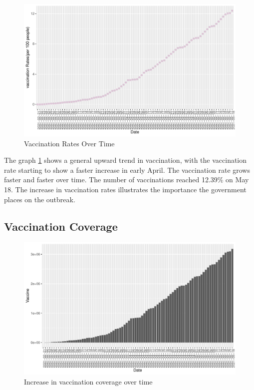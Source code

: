 \documentclass[11pt,a4paper,]{article}
\begin{document}
\begin{figure}
\centering
\includegraphics{report_files/figure-latex/FigRefplot-1.pdf}
\caption{\label{fig:FigRefplot}Vaccination Rates Over Time}
\end{figure}

The graph \ref{fig:FigRefplot} shows a general upward trend in vaccination, with the vaccination rate starting to show a faster increase in early April. The vaccination rate grows faster and faster over time. The number of vaccinations reached 12.39\% on May 18. The increase in vaccination rates illustrates the importance the government places on the outbreak.

\hypertarget{vaccination-coverage}{%
\subsection{Vaccination Coverage}\label{vaccination-coverage}}

\begin{figure}

{\centering \includegraphics{report_files/figure-latex/FigRefz-1} 

}

\caption{Increase in vaccination coverage over time}\label{fig:FigRefz}
\end{figure}
\end{document}
